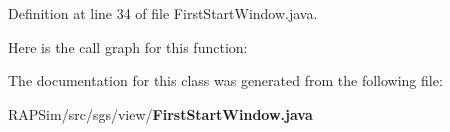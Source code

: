Definition at line 34 of file First\-Start\-Window.\-java.



Here is the call graph for this function\-:




The documentation for this class was generated from the following file\-:\begin{DoxyCompactItemize}
\item 
R\-A\-P\-Sim/src/sgs/view/{\bf First\-Start\-Window.\-java}\end{DoxyCompactItemize}
